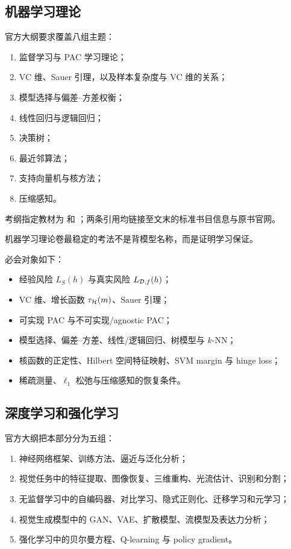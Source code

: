 \documentclass[11pt]{ctexart}
\begin{document}
\subsection{机器学习理论}

官方大纲要求覆盖八组主题：

\begin{enumerate}
  \item 监督学习与 PAC 学习理论；
  \item VC 维、Sauer 引理，以及样本复杂度与 VC 维的关系；
  \item 模型选择与偏差--方差权衡；
  \item 线性回归与逻辑回归；
  \item 决策树；
  \item 最近邻算法；
  \item 支持向量机与核方法；
  \item 压缩感知。
\end{enumerate}

考纲指定教材为 \textcite{shalev2014uml} 和 \textcite{mohri2018foundations}；两条引用均链接至文末的标准书目信息与原书官网。

机器学习理论卷最稳定的考法不是背模型名称，而是证明学习保证。

必会对象如下：

\begin{itemize}
  \item 经验风险 \(L_S(h)\) 与真实风险 \(L_{\mathcal{D},f}(h)\)；
  \item VC 维、增长函数 \(\tau_{\mathcal{H}}(m)\)、Sauer 引理；
  \item 可实现 PAC 与不可实现/agnostic PAC；
  \item 模型选择、偏差--方差、线性/逻辑回归、树模型与 \(k\)-NN；
  \item 核函数的正定性、Hilbert 空间特征映射、SVM margin 与 hinge loss；
  \item 稀疏测量、\(\ell_1\) 松弛与压缩感知的恢复条件。
\end{itemize}

\MLTextbooks

\subsection{深度学习和强化学习}

官方大纲把本部分分为五组：

\begin{enumerate}
  \item 神经网络框架、训练方法、逼近与泛化分析；
  \item 视觉任务中的特征提取、图像恢复、三维重构、光流估计、识别和分割；
  \item 无监督学习中的自编码器、对比学习、隐式正则化、迁移学习和元学习；
  \item 视觉生成模型中的 GAN、VAE、扩散模型、流模型及表达力分析；
  \item 强化学习中的贝尔曼方程、Q-learning 与 policy gradient。
\end{enumerate}
\end{document}
